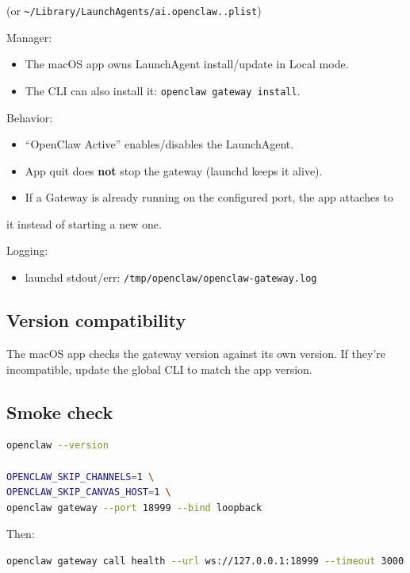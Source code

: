 (or \texttt{\textasciitilde{}/Library/LaunchAgents/ai.openclaw..plist})

Manager:

\begin{itemize}
  \item The macOS app owns LaunchAgent install/update in Local mode.
  \item The CLI can also install it: \texttt{openclaw gateway install}.
\end{itemize}


Behavior:

\begin{itemize}
  \item “OpenClaw Active” enables/disables the LaunchAgent.
  \item App quit does \textbf{not} stop the gateway (launchd keeps it alive).
  \item If a Gateway is already running on the configured port, the app attaches to
\end{itemize}

it instead of starting a new one.

Logging:

\begin{itemize}
  \item launchd stdout/err: \texttt{/tmp/openclaw/openclaw-gateway.log}
\end{itemize}


\subsection{Version compatibility}


The macOS app checks the gateway version against its own version. If they’re
incompatible, update the global CLI to match the app version.

\subsection{Smoke check}


\begin{lstlisting}[language=bash]
openclaw --version

OPENCLAW_SKIP_CHANNELS=1 \
OPENCLAW_SKIP_CANVAS_HOST=1 \
openclaw gateway --port 18999 --bind loopback
\end{lstlisting}


Then:

\begin{lstlisting}[language=bash]
openclaw gateway call health --url ws://127.0.0.1:18999 --timeout 3000
\end{lstlisting}



